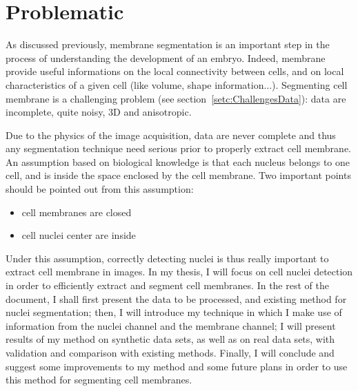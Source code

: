 \section{Problematic}

As discussed previously, membrane segmentation is an important step in the process of understanding the development of an embryo.
Indeed, membrane provide useful informations on the local connectivity between cells, and on local characteristics of a given cell (like volume, shape information...).
Segmenting cell membrane is a challenging problem (see section~\ref{setc:ChallengesData}): data are incomplete, quite noisy, 3D and anisotropic.

Due to the physics of the image acquisition, data are never complete and thus any segmentation technique need serious prior to properly extract cell membrane.
An assumption based on biological knowledge is that each nucleus belongs to one cell, and is inside the space enclosed by the cell membrane.
Two important points should be pointed out from this assumption:\begin{itemize}
    \item cell membranes are closed
    \item cell nuclei center are inside
\end{itemize}

Under this assumption, correctly detecting nuclei is thus really important to extract cell membrane in images.
In my thesis, I will focus on cell nuclei detection in order to efficiently extract and segment cell membranes.
In the rest of the document, I shall first present the data to be processed, and existing method for nuclei segmentation;
then, I will introduce my technique in which I make use of information from the nuclei channel and the membrane channel;
I will present results of my method on synthetic data sets, as well as on real data sets, with validation and comparison with existing methods.
Finally, I will conclude and suggest some improvements to my method and some future plans in order to use this method for segmenting cell membranes. 
